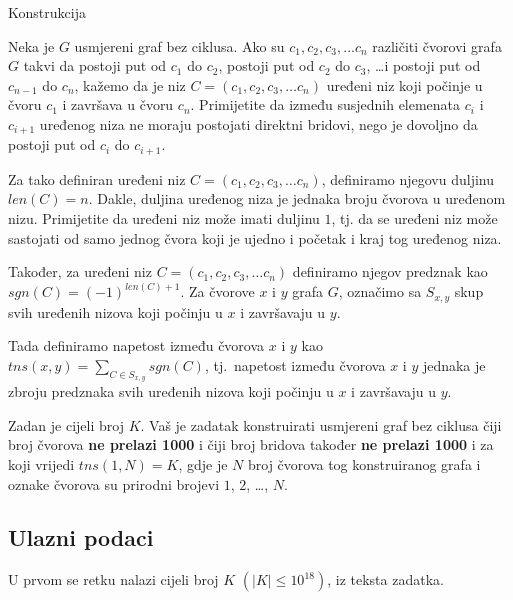 \begin{statement}[
  problempoints=110,
  timelimit=1 sekunda,
  memorylimit=512 MiB,
]{Konstrukcija}


Neka je $G$ usmjereni graf bez ciklusa. Ako su $c_1, c_2, c_3, \dots c_n$
različiti čvorovi grafa $G$ takvi da postoji put od $c_1$ do $c_2$, postoji
put od $c_2$ do $c_3$, \dots i postoji put od $c_{n-1}$ do $c_n$, kažemo da
je niz $C = (c_1, c_2, c_3, \dots c_n)$ uređeni niz koji počinje u čvoru
$c_1$ i završava u čvoru $c_n$. Primijetite da između susjednih elemenata
$c_i$ i $c_{i+1}$ uređenog niza ne moraju postojati direktni bridovi, nego je
dovoljno da postoji put od $c_i$ do $c_{i+1}$.

Za tako definiran uređeni niz $C = (c_1, c_2, c_3, \dots c_n)$, definiramo
njegovu duljinu $len(C) = n$.  Dakle, duljina uređenog niza je jednaka broju
čvorova u uređenom nizu.  Primijetite da uređeni niz može imati duljinu $1$,
tj. da se uređeni niz može sastojati od samo jednog čvora koji je ujedno i
početak i kraj tog uređenog niza.

Također, za uređeni niz $C = (c_1, c_2, c_3, \dots c_n)$ definiramo
njegov predznak kao $sgn(C) = (-1)^{len(C)+1}$.  Za čvorove $x$ i $y$ grafa
$G$, označimo sa $S_{x,y}$ skup svih uređenih nizova koji počinju u $x$ i
završavaju u $y$.

Tada definiramo napetost između čvorova $x$ i $y$ kao $tns(x, y)=\sum_{C \in
S_{x, y}}{sgn(C)}$, tj.\ napetost između čvorova $x$ i $y$ jednaka je zbroju
predznaka svih uređenih nizova koji počinju u $x$ i završavaju u $y$.

Zadan je cijeli broj $K$. Vaš je zadatak konstruirati usmjereni graf bez
ciklusa čiji broj čvorova \textbf{ne prelazi 1000} i čiji broj bridova
također \textbf{ne prelazi 1000} i za koji vrijedi $tns(1, N) = K$, gdje je
$N$ broj čvorova tog konstruiranog grafa i oznake čvorova su prirodni brojevi
$1$, $2$, \dots, $N$.

\subsection*{Ulazni podaci}
U prvom se retku nalazi cijeli broj $K$ $(|K| \le 10^{18})$, iz
teksta zadatka.


\end{statement}
